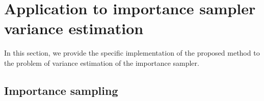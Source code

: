 \documentclass[review]{elsarticle}
\begin{document}






\color{black}


\section{Application to importance sampler variance estimation}
\label{sec_IS}

In this section, we provide the specific implementation of the proposed method to the problem of variance estimation of the importance sampler. %


\subsection{Importance sampling}
\end{document}
